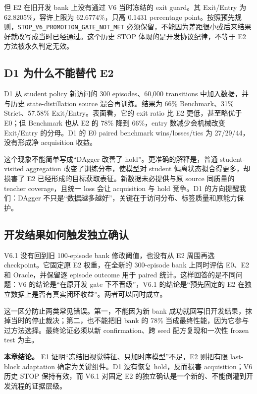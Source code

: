 但 E2 在旧开发 bank 上没有通过 V6 当时冻结的 exit guard。其 Exit/Entry 为 62.8205\%，容许上限为 62.6774\%，只高 0.1431 percentage point。按照预先规则，\nolinkurl{STOP_V6_PROMOTION_GATE_NOT_MET} 必须保留，不能因为差距很小或后来结果好就改写成当时已经通过。这个历史 STOP 体现的是开发协议纪律，不等于 E2 方法被永久判定无效。

\hypertarget{d1-ux4e3aux4ec0ux4e48ux4e0dux80fdux66ffux4ee3-e2}{%
\subsection{D1 为什么不能替代 E2}\label{d1-ux4e3aux4ec0ux4e48ux4e0dux80fdux66ffux4ee3-e2}}

D1 从 student policy 新访问的 300 episodes、60,000 transitions 中加入数据，并与历史 state-distillation source 混合再训练。结果为 66\% Benchmark、31\% Strict、57.58\% Exit/Entry。表面看，它的 exit ratio 比 E2 更低，甚至略优于 E0；但 Benchmark 也从 E2 的 78\% 降到 66\%，entry 数减少会机械改变 Exit/Entry 的分母。D1 的 E0 paired benchmark wins/losses/ties 为 27/29/44，没有形成净 acquisition 收益。

这个现象不能简单写成``DAgger 改善了 hold''。更准确的解释是，普通 student-visited aggregation 改变了训练分布，使模型对 student 偏离状态拟合得更多，却损害了 E2 已经形成的目标获取表征。新数据未必提供与原 source 同质量的 teacher coverage，且统一 loss 会让 acquisition 与 hold 竞争。D1 的方向提醒我们：DAgger 不只是``数据越多越好''，关键在于访问分布、标签质量和原能力保护。

\hypertarget{ux5f00ux53d1ux7ed3ux679cux5982ux4f55ux89e6ux53d1ux72ecux7acbux786eux8ba4}{%
\subsection{开发结果如何触发独立确认}\label{ux5f00ux53d1ux7ed3ux679cux5982ux4f55ux89e6ux53d1ux72ecux7acbux786eux8ba4}}

V6.1 没有回到旧 100-episode bank 修改阈值，也没有从 E2 周围再选 checkpoint。它固定原 E2 权重，在全新的 300-episode bank 上同时评估 E0、E2 和 Oracle，并保留逐 episode outcome 用于 paired 统计。这样回答的是不同问题：V6 的结论是``在原开发 gate 下不晋级''，V6.1 的结论是``预先固定的 E2 在独立数据上是否有真实闭环收益''。两者可以同时成立。

这一区分防止两类常见错误。第一，不能因为新 bank 成功就回写旧开发结果，抹掉当时的停止裁决；第二，也不能把旧 bank 的 78\% 当成最终性能，因为它参与过方法选择。最终论证必须以新 confirmation、跨 seed 配方复现和一次性 frozen test 为主。

\textbf{本章结论。} E1 证明``冻结旧视觉特征、只加时序模型''不足，E2 则把有限 last-block adaptation 确定为关键组件。D1 没有恢复 hold，反而损害 acquisition；V6 历史 STOP 保持有效，而 V6.1 对固定 E2 的独立确认是一个新的、不能倒灌到开发流程的证据层级。
